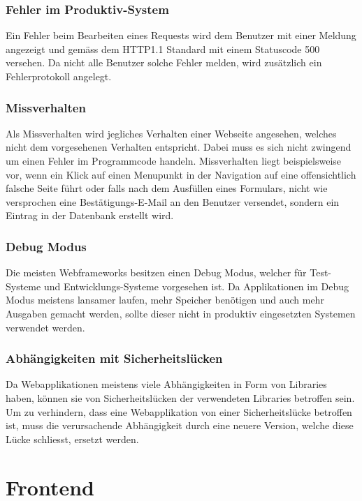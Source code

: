 \subsubsection{Fehler im Produktiv-System}
\label{ssub:fehlerimproduktivsystem}
Ein Fehler beim Bearbeiten eines Requests wird dem Benutzer mit einer Meldung angezeigt und gemäss dem HTTP1.1\cite{rfc2616} Standard mit einem Statuscode 500 versehen. Da nicht alle Benutzer solche Fehler melden, wird zusätzlich ein Fehlerprotokoll angelegt.

\subsubsection{Missverhalten}
\label{ssub:missverhalten}
Als Missverhalten wird jegliches Verhalten einer Webseite angesehen, welches nicht dem vorgesehenen Verhalten entspricht. Dabei muss es sich nicht zwingend um einen Fehler im Programmcode handeln. Missverhalten liegt beispielsweise vor, wenn ein Klick auf einen Menupunkt in der Navigation auf eine offensichtlich falsche Seite führt oder falls nach dem Ausfüllen eines Formulars, nicht wie versprochen eine Bestätigungs-E-Mail an den Benutzer versendet, sondern ein Eintrag in der Datenbank erstellt wird.

\subsubsection{Debug Modus}
\label{ssub:debugmodus}
Die meisten Webframeworks besitzen einen Debug Modus, welcher für Test-Systeme und Entwicklungs-Systeme vorgesehen ist. Da Applikationen im Debug Modus meistens lansamer laufen, mehr Speicher benötigen und auch mehr Ausgaben gemacht werden, sollte dieser nicht in produktiv eingesetzten Systemen verwendet werden.

\subsubsection{Abhängigkeiten mit Sicherheitslücken}
\label{ssub:abhaengigkeitenmitsicherheitsluecken}
Da Webapplikationen meistens viele Abhängigkeiten in Form von Libraries haben, können sie von Sicherheitslücken der verwendeten Libraries betroffen sein. Um zu verhindern, dass eine Webapplikation von einer Sicherheitslücke betroffen ist, muss die verursachende Abhängigkeit durch eine neuere Version, welche diese Lücke schliesst, ersetzt werden.

\section{Frontend}
\label{sec:frontend}

